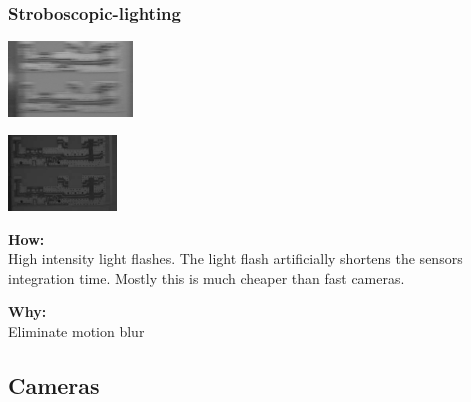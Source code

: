 \documentclass[a4paper, fontsize=8pt, landscape, DIV=1]{scrartcl}
\begin{document}
\begin{multicols*}{4}
		\subsubsection{Stroboscopic-lighting}
		\begin{minipage}[t]{0.49\columnwidth}
			\begin{flushleft}
				\includegraphics[width=\columnwidth, height=2cm]{images//ImageAcq/blur.png}\\
			\end{flushleft}
		\end{minipage}
		\begin{minipage}[t]{0.49\columnwidth}
			\begin{flushleft}
				\includegraphics[width=\columnwidth, height=2cm]{images//ImageAcq/no_blur.png}\\
			\end{flushleft}
		\end{minipage}
		\par 
		\textbf{How:}\\
		High intensity light flashes. The light flash artificially shortens the sensors integration time. Mostly this is much cheaper than fast cameras.
		\par 
		\textbf{Why:}\\
		Eliminate motion blur
		
		\subsection{Cameras}

\end{multicols*}
\end{document}
